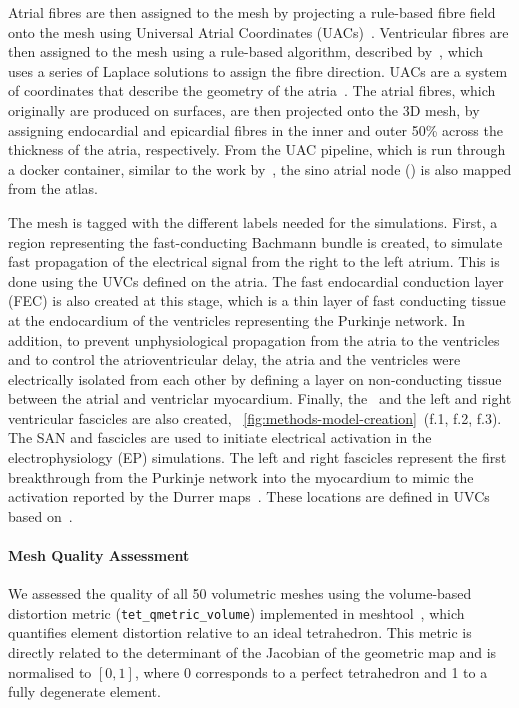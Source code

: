 Atrial fibres are then assigned to the mesh by projecting a rule-based fibre 
field~\cite{labarthe2016_model}
onto the mesh using Universal Atrial Coordinates (UACs)~\cite{Roney2021-atlas}.
Ventricular fibres are then assigned to the mesh using a rule-based algorithm, 
described by~\cite{bayer2012_fibres},
which uses a series of Laplace solutions to assign the fibre direction.
UACs are a system of coordinates that describe the geometry of the atria~\cite{Roney2021-atlas}.
The atrial fibres, which originally are produced on surfaces, are then projected onto 
the 3D mesh, by assigning endocardial and epicardial fibres in the inner and outer 50\% 
across the thickness of the atria, respectively. 
From the UAC pipeline, which is run through a docker container, similar to the work 
by~\cite{solis-lemus2023_reproducibility}, the sino atrial node (\SAN) is also mapped
from the atlas. 

The mesh is tagged with the different labels needed for the simulations.
First, a region representing the fast-conducting Bachmann bundle is created, 
to simulate fast propagation of the electrical signal from the right to the left atrium. 
This is done using the UVCs defined on the atria.
The fast endocardial conduction layer (FEC) is also created at this stage, 
which is a thin layer of fast conducting tissue at the endocardium of the 
ventricles representing the Purkinje network.
In addition, to prevent unphysiological propagation from the atria to the ventricles and to 
control the atrioventricular delay, 
the atria and the ventricles were electrically isolated from each other by defining a 
layer on non-conducting
tissue between the atrial and ventriclar myocardium.
Finally, the \SAN\ and the left and right ventricular fascicles are also created, 
~\ref{fig:methods-model-creation}~(f.1, f.2, f.3). 
The SAN and fascicles are used to initiate electrical activation in the electrophysiology (EP) simulations. 
The left and right fascicles represent the first breakthrough from the Purkinje network into 
the myocardium to mimic the activation reported by the Durrer maps~\cite{durrer-1970-fascicles}. 
These locations are defined in UVCs based on~\cite{gillette_automated_2021}.

\paragraph{Mesh Quality Assessment}
    We assessed the quality of all 50 volumetric meshes using the volume-based 
    distortion metric (\texttt{tet\_qmetric\_volume}) implemented in 
    meshtool~\cite{Neic2020-meshtool}, which quantifies element distortion relative to 
    an ideal tetrahedron. This metric is directly related to the determinant 
    of the Jacobian of the geometric map and is normalised to $[0, 1]$, where 
    0 corresponds to a perfect tetrahedron and 1 to a fully degenerate element.

